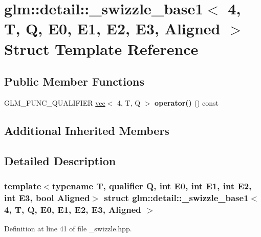 \hypertarget{structglm_1_1detail_1_1__swizzle__base1_3_014_00_01T_00_01Q_00_01E0_00_01E1_00_01E2_00_01E3_00_01Aligned_01_4}{}\section{glm\+:\+:detail\+:\+:\+\_\+swizzle\+\_\+base1$<$ 4, T, Q, E0, E1, E2, E3, Aligned $>$ Struct Template Reference}
\label{structglm_1_1detail_1_1__swizzle__base1_3_014_00_01T_00_01Q_00_01E0_00_01E1_00_01E2_00_01E3_00_01Aligned_01_4}
\subsection*{Public Member Functions}
\begin{DoxyCompactItemize}
\item 
\mbox{\label{structglm_1_1detail_1_1__swizzle__base1_3_014_00_01T_00_01Q_00_01E0_00_01E1_00_01E2_00_01E3_00_01Aligned_01_4_a4f7066f4879ee4e9a999748d556c9198}} 
G\+L\+M\+\_\+\+F\+U\+N\+C\+\_\+\+Q\+U\+A\+L\+I\+F\+I\+ER \hyperlink{structglm_1_1vec}{vec}$<$ 4, T, Q $>$ {\bfseries operator()} () const
\end{DoxyCompactItemize}
\subsection*{Additional Inherited Members}


\subsection{Detailed Description}
\subsubsection*{template$<$typename T, qualifier Q, int E0, int E1, int E2, int E3, bool Aligned$>$\newline
struct glm\+::detail\+::\+\_\+swizzle\+\_\+base1$<$ 4, T, Q, E0, E1, E2, E3, Aligned $>$}



Definition at line 41 of file \+\_\+swizzle.\+hpp.



